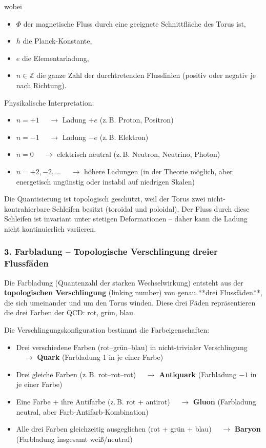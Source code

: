 	wobei
	\begin{itemize}
		\item $\Phi$ der magnetische Fluss durch eine geeignete Schnittfläche des Torus ist,
		\item $h$ die Planck-Konstante,
		\item $e$ die Elementarladung,
		\item $n \in \mathbb{Z}$ die ganze Zahl der durchtretenden Flusslinien (positiv oder negativ je nach Richtung).
	\end{itemize}
	
	Physikalische Interpretation:
	\begin{itemize}
		\item $n = +1$ $\quad \to$ Ladung $+e$ \quad (z.\,B. Proton, Positron)
		\item $n = -1$ $\quad \to$ Ladung $-e$ \quad (z.\,B. Elektron)
		\item $n = 0$   $\quad \to$ elektrisch neutral \quad (z.\,B. Neutron, Neutrino, Photon)
		\item $n = +2, -2, \dots$ $\quad \to$ höhere Ladungen (in der Theorie möglich, aber energetisch ungünstig oder instabil auf niedrigen Skalen)
	\end{itemize}
	
	Die Quantisierung ist topologisch geschützt, weil der Torus zwei nicht-kontrahierbare Schleifen besitzt (toroidal und poloidal). Der Fluss durch diese Schleifen ist invariant unter stetigen Deformationen – daher kann die Ladung nicht kontinuierlich variieren.
	
	\subsubsection{3. Farbladung – Topologische Verschlingung dreier Flussfäden}
	
	Die Farbladung (Quantenzahl der starken Wechselwirkung) entsteht aus der \textbf{topologischen Verschlingung} (linking number) von genau **drei Flussfäden**, die sich umeinander und um den Torus winden. Diese drei Fäden repräsentieren die drei Farben der QCD: rot, grün, blau.
	
	Die Verschlingungskonfiguration bestimmt die Farbeigenschaften:
	\begin{itemize}
		\item Drei verschiedene Farben (rot–grün–blau) in nicht-trivialer Verschlingung $\quad \to$ \textbf{Quark} \quad (Farbladung 1 in je einer Farbe)
		\item Drei gleiche Farben (z.\,B. rot–rot–rot) $\quad \to$ \textbf{Antiquark} \quad (Farbladung $-1$ in je einer Farbe)
		\item Eine Farbe + ihre Antifarbe (z.\,B. rot + antirot) $\quad \to$ \textbf{Gluon} \quad (Farbladung neutral, aber Farb-Antifarb-Kombination)
		\item Alle drei Farben gleichzeitig ausgeglichen (rot + grün + blau) $\quad \to$ \textbf{Baryon} \quad (Farbladung insgesamt weiß/neutral)
	\end{itemize}
	
